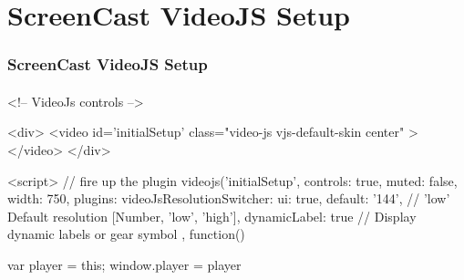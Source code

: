 \section{ScreenCast VideoJS Setup}



\begin{comment}
*****  [[elisp:(org-cycle)][| ]]  [[elisp:(blee:ppmm:org-mode-toggle)][Nat]] [[elisp:(beginning-of-buffer)][Top]] [[elisp:(delete-other-windows)][(1)]] || /Frame/ *Label=ScreenCastVideoJSSetup*  ScreenCast VideoJS Setup ::  [[elisp:(org-cycle)][| ]]
\end{comment}

\begin{frame}[fragile,label=ScreenCastVideoJSSetup]
    \frametitle{ScreenCast VideoJS Setup}
    \framesubtitle{}


\begin{comment}
******  [[elisp:(org-cycle)][| ]]  [[elisp:(blee:ppmm:org-mode-toggle)][Nat]] [[elisp:(beginning-of-buffer)][Top]] [[elisp:(delete-other-windows)][(1)]] || /VideoJs/ =PresArt=  *master-initialSetup.mp4* -- initialSetup ::  [[elisp:(org-cycle)][| ]]
\end{comment}

\begin{presentationMode}
\begin{htmlonly}
  \begin{rawhtml}
      <!-- VideoJs  controls -->

<div>
  <video id='initialSetup' class="video-js vjs-default-skin center" ></video>
</div>

  <script>
    // fire up the plugin
    videojs('initialSetup', {
      controls: true,
      muted: false,
      width: 750,
      plugins: {
        videoJsResolutionSwitcher: {
          ui: true,
          default: '144', // 'low' Default resolution [{Number}, 'low', 'high'],
          dynamicLabel: true // Display dynamic labels or gear symbol
        }
      }
    }, function(){
      var player = this;
      window.player = player

}
\end{rawhtml}
\end{htmlonly}
\end{presentationMode}
\end{frame}
